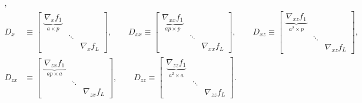 \documentclass{article}
\begin{document}
\begin{align*}
    ,                                                                                                \\
    D_x    & \equiv  \begin{bmatrix}
                         \underbrace{\nabla_x f_1}_{a\times p} &                       \\
                                                               & \ddots                \\
                                                               &        & \nabla_x f_L
                     \end{bmatrix}
    , \qquad
    D_{xx} \equiv \begin{bmatrix}
                      \underbrace{\nabla_{xx} f_1}_{ap\times p} &        &                 \\
                                                                & \ddots &                 \\
                                                                &        & \nabla_{xx} f_L
                  \end{bmatrix}
    , \qquad
    D_{xz} \equiv
    \begin{bmatrix}
        \underbrace{\nabla_{xz} f_1}_{a^2 \times p} &        &                 \\
                                                    & \ddots &                 \\
                                                    &        & \nabla_{xz} f_L
    \end{bmatrix}
    ,                                                                                                \\
    D_{zx} & \equiv \begin{bmatrix}
                        \underbrace{\nabla_{zx} f_1}_{ap \times a} &        &                 \\
                                                                   & \ddots &                 \\
                                                                   &        & \nabla_{zx} f_L
                    \end{bmatrix}
    ,
    \qquad
    D_{zz}  \equiv \begin{bmatrix}
                       \underbrace{\nabla_{zz} f_1}_{a^2\times a} &        &                 \\
                                                                  & \ddots &                 \\
                                                                  &        & \nabla_{zz} f_L
                   \end{bmatrix}
    .
\end{align*}
\end{document}
